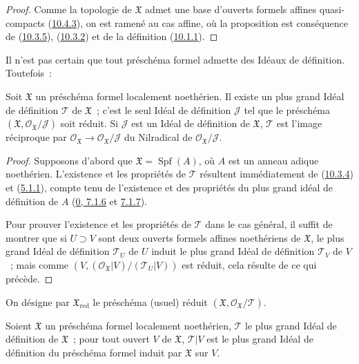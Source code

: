 \begin{proof}
Comme la topologie de $\mathfrak{X}$ admet une base d'ouverts formels
affines quasi-compacts (\hyperref[I.10.4.3-fr]{10.4.3}), on est ramené au
cas affine, où la proposition est conséquence de
(\hyperref[I.10.3.5-fr]{10.3.5}),
(\hyperref[I.10.3.2-fr]{10.3.2}) et de la définition
(\hyperref[I.10.1.1-fr]{10.1.1}).
\end{proof}

Il n'est pas certain que tout préschéma formel admette des Idéaux de
définition. Toutefois~:

\begin{proposition}[10.5.4]
\label{I.10.5.4-fr}
Soit $\mathfrak{X}$ un préschéma formel localement noethérien. Il existe
un plus grand Idéal de définition $\mathscr{T}$ de $\mathfrak{X}$~;
c'est le seul Idéal de définition $\mathscr{J}$ tel que le préschéma
$(\mathfrak{X},\mathscr{O}_{\mathfrak{X}}/\mathscr{J})$ soit réduit. Si
$\mathscr{J}$ est un Idéal de définition de $\mathfrak{X}$,
$\mathscr{T}$ est l'image réciproque par
$\mathscr{O}_{\mathfrak{X}}\to
\mathscr{O}_{\mathfrak{X}}/\mathscr{J}$ du Nilradical de
$\mathscr{O}_{\mathfrak{X}}/\mathscr{J}$.
\end{proposition}

\begin{proof}
Supposons d'abord que $\mathfrak{X}=\operatorname{Spf}(A)$, où $A$ est
un anneau adique noethérien. L'existence et les propriétés de
$\mathscr{T}$ résultent immédiatement de
(\hyperref[I.10.3.4-fr]{10.3.4}) et
(\hyperref[I.5.1.1-fr]{5.1.1}), compte tenu de l'existence et des
propriétés du plus grand idéal de définition de $A$
(\hyperref[0.7.1.6-fr]{0, 7.1.6} et
\hyperref[0.7.1.7-fr]{7.1.7}).

Pour prouver l'existence et les propriétés de $\mathscr{T}$ dans le cas
général, il suffit de montrer que si $U\supset V$ sont deux ouverts
formels affines noethériens de $\mathfrak{X}$, le plus grand Idéal de
définition $\mathscr{T}_U$ de $U$ induit le plus grand Idéal de définition
$\mathscr{T}_V$ de $V$~; mais comme
$(V,(\mathscr{O}_{\mathfrak{X}}|V)/(\mathscr{T}_U|V))$ est réduit, cela
résulte de ce qui précède.
\end{proof}

On désigne par $\mathfrak{X}_{\mathrm{red}}$ le préschéma (usuel) réduit
$(\mathfrak{X},\mathscr{O}_{\mathfrak{X}}/\mathscr{T})$.

\begin{corollary}[10.5.5]
\label{I.10.5.5-fr}
Soient $\mathfrak{X}$ un préschéma formel localement noethérien,
$\mathscr{T}$ le plus grand Idéal de définition de $\mathfrak{X}$~; pour
tout ouvert $V$ de $\mathfrak{X}$, $\mathscr{T}|V$ est le plus grand
Idéal de définition du préschéma formel induit par $\mathfrak{X}$ sur
$V$.
\end{corollary}


